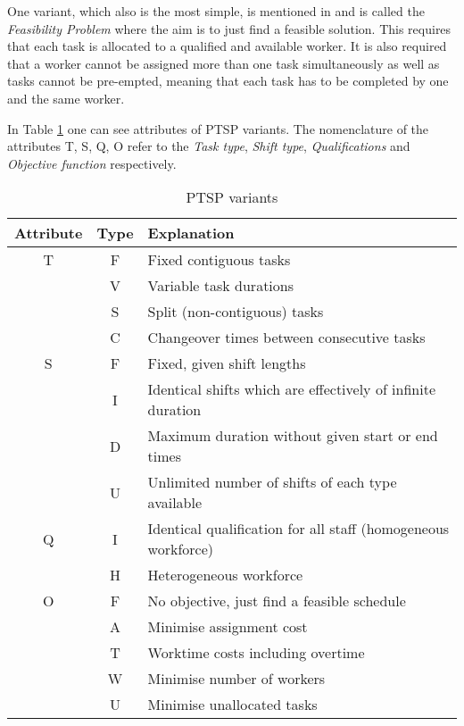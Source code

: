 One variant, which also is the most simple, is mentioned in \citet{krishnamoorthy_2001} and is called the \textit{Feasibility Problem} where the aim is to just find a feasible solution. This requires that each task is allocated to a qualified and available worker. It is also required that a worker cannot be assigned more than one task simultaneously as well as tasks cannot be pre-empted, meaning that each task has to be completed by one and the same worker.

In Table \ref{tab:PTSP} one can see attributes of PTSP variants. The nomenclature of the attributes T, S, Q, O refer to the \textit{Task type}, \textit{Shift type}, \textit{Qualifications} and \textit{Objective function} respectively. 
\begin{table}[H]
\caption{PTSP variants}
\label{tab:PTSP}
\begin{tabular}{|c|c|l|}
\hline
\textbf{Attribute} & \textbf{Type} & \textbf{Explanation} \\ \hline
T & F & Fixed contiguous tasks \\
& V & Variable task durations \\
& S & Split (non-contiguous) tasks \\
& C & Changeover times between consecutive tasks \\
\hline 
S & F & Fixed, given shift lengths \\
& I & Identical shifts which are effectively of infinite duration \\
& D & Maximum duration without given start or end times \\
& U & Unlimited number of shifts of each type available \\
\hline 
Q & I & Identical qualification for all staff (homogeneous workforce) \\
& H & Heterogeneous workforce \\
\hline 
O & F & No objective, just find a feasible schedule \\
& A & Minimise assignment cost \\
& T & Worktime costs including overtime \\
& W & Minimise number of workers \\
& U & Minimise unallocated tasks \\
\hline  

\end{tabular}
\end{table}

